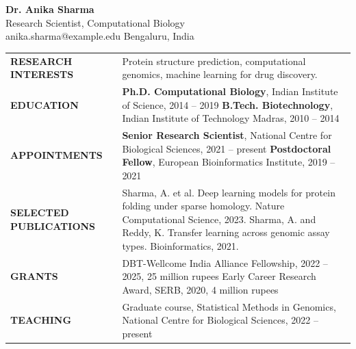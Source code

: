 \documentclass[10pt,a4paper]{article}
\begin{document}
\begin{center}
{\Huge\bfseries Dr. Anika Sharma}\\[3pt]
{\Large Research Scientist, Computational Biology}\\[3pt]
{\small anika.sharma@example.edu \quad Bengaluru, India}
\end{center}

\vspace{10pt}
\noindent
\begin{tabular}{@{}p{1.7in}p{4.2in}@{}}
\textcolor{accent}{\bfseries RESEARCH INTERESTS} &
Protein structure prediction, computational genomics, machine learning for drug discovery. \\[10pt]

\textcolor{accent}{\bfseries EDUCATION} &
\textbf{Ph.D. Computational Biology}, Indian Institute of Science, 2014 -- 2019 \newline
\textbf{B.Tech. Biotechnology}, Indian Institute of Technology Madras, 2010 -- 2014 \\[10pt]

\textcolor{accent}{\bfseries APPOINTMENTS} &
\textbf{Senior Research Scientist}, National Centre for Biological Sciences, 2021 -- present \newline
\textbf{Postdoctoral Fellow}, European Bioinformatics Institute, 2019 -- 2021 \\[10pt]

\textcolor{accent}{\bfseries SELECTED PUBLICATIONS} &
Sharma, A. et al. Deep learning models for protein folding under sparse homology. Nature Computational Science, 2023. \newline
Sharma, A. and Reddy, K. Transfer learning across genomic assay types. Bioinformatics, 2021. \\[10pt]

\textcolor{accent}{\bfseries GRANTS} &
DBT-Wellcome India Alliance Fellowship, 2022 -- 2025, 25 million rupees \newline
Early Career Research Award, SERB, 2020, 4 million rupees \\[10pt]

\textcolor{accent}{\bfseries TEACHING} &
Graduate course, Statistical Methods in Genomics, National Centre for Biological Sciences, 2022 -- present \\
\end{tabular}
\end{document}
